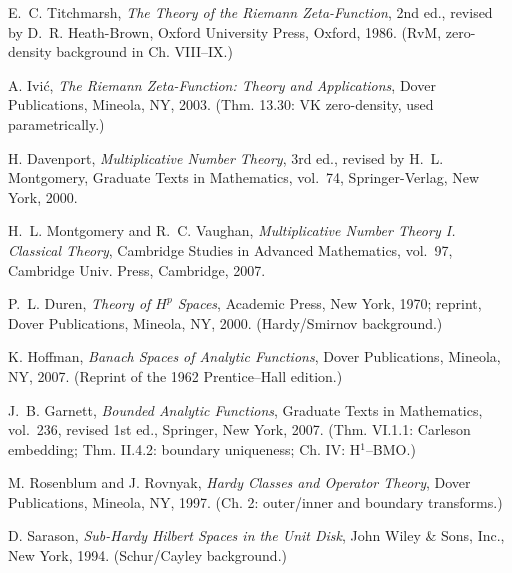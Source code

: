 \documentclass[11pt]{article}
\theoremstyle{definition}
\theoremstyle{remark}
\begin{document}
\par\normalfont\normalsize
\begin{thebibliography}{99}
\makeatletter\setcounter{NAT@ctr}{0}\setcounter{enumiv}{0}\makeatother{} E.~C. Titchmarsh, \emph{The Theory of the Riemann Zeta-Function}, 2nd ed., revised by D.~R. Heath-Brown, Oxford University Press, Oxford, 1986. (RvM, zero-density background in Ch. VIII--IX.)




 A. Ivi\'c, \emph{The Riemann Zeta-Function: Theory and Applications}, Dover Publications, Mineola, NY, 2003. (Thm. 13.30: VK zero-density, used parametrically.)




 H. Davenport, \emph{Multiplicative Number Theory}, 3rd ed., revised by H.~L. Montgomery, Graduate Texts in Mathematics, vol.~74, Springer-Verlag, New York, 2000.




 H.~L. Montgomery and R.~C. Vaughan, \emph{Multiplicative Number Theory I. Classical Theory}, Cambridge Studies in Advanced Mathematics, vol.~97, Cambridge Univ. Press, Cambridge, 2007.




 P.~L. Duren, \emph{Theory of $H^p$ Spaces}, Academic Press, New York, 1970; reprint, Dover Publications, Mineola, NY, 2000. (Hardy/Smirnov background.)




 K. Hoffman, \emph{Banach Spaces of Analytic Functions}, Dover Publications, Mineola, NY, 2007. (Reprint of the 1962 Prentice--Hall edition.)




 J.~B. Garnett, \emph{Bounded Analytic Functions}, Graduate Texts in Mathematics, vol.~236, revised 1st ed., Springer, New York, 2007. (Thm. VI.1.1: Carleson embedding; Thm. II.4.2: boundary uniqueness; Ch. IV: H$^1$–BMO.)




 M. Rosenblum and J. Rovnyak, \emph{Hardy Classes and Operator Theory}, Dover Publications, Mineola, NY, 1997. (Ch. 2: outer/inner and boundary transforms.)




 D. Sarason, \emph{Sub-Hardy Hilbert Spaces in the Unit Disk}, John Wiley \& Sons, Inc., New York, 1994. (Schur/Cayley background.)





\end{thebibliography}
\end{document}
